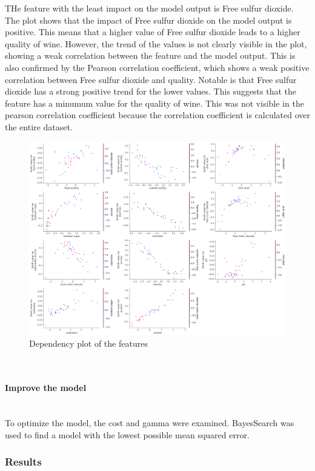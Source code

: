 \documentclass{article}
\newcommand{\subsubsubsection}[1]{%
  \paragraph{#1}\mbox{}\\}
\begin{document}
THe feature with the least impact on the model output is Free sulfur dioxide.
The plot shows that the impact of Free sulfur dioxide on the model output is positive.
This means that a higher value of Free sulfur dioxide leads to a higher quality of wine.
However, the trend of the values is not clearly visible in the plot, showing a weak correlation between the feature and the model output.
This is also confirmed by the Pearson correlation coefficient, which shows a weak positive correlation between Free sulfur dioxide and quality.
Notable is that Free sulfur dioxide has a strong positive trend for the lower values. This suggests that the feature has a minumum value for the quality of wine.
This was not visible in the pearson correlation coefficient because the correlation coefficient is calculated over the entire dataset.

\begin{figure}
    \centering
    \includegraphics[width=\linewidth]{figures/shap-dependency-svr.png}
    \caption{Dependency plot of the features}
    \label{fig:dependency-plot-svr}
\end{figure}
\subsubsubsection{Improve the model}
To optimize the model, the cost and gamma were examined. BayesSearch was used to find a model with the lowest possible mean squared error. 

\subsubsection{Results}
\end{document}

